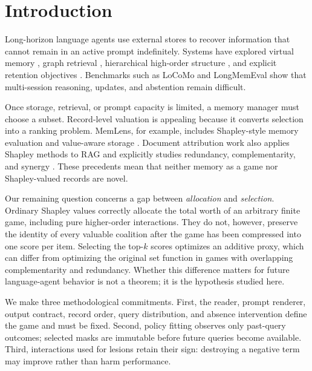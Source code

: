 \section{Introduction}
\label{sec:introduction}

Long-horizon language agents use external stores to recover information that cannot
remain in an active prompt indefinitely. Systems have explored virtual memory
\citep{packer2023memgpt}, graph retrieval \citep{gutierrez2024hipporag},
hierarchical high-order structure \citep{yue2026hypermem}, and explicit retention
objectives \citep{kang2026oslmr}. Benchmarks such as LoCoMo
\citep{maharana2024locomo} and LongMemEval \citep{wu2025longmemeval} show that
multi-session reasoning, updates, and abstention remain difficult.

Once storage, retrieval, or prompt capacity is limited, a memory manager must choose
a subset. Record-level valuation is appealing because it converts selection into a
ranking problem. MemLens, for example, includes Shapley-style memory evaluation and
value-aware storage \citep{wei2026memlens}. Document attribution work also applies
Shapley methods to RAG and explicitly studies redundancy, complementarity, and
synergy \citep{nematov2025source}. These precedents mean that neither memory as a
game nor Shapley-valued records are novel.

Our remaining question concerns a gap between \emph{allocation} and
\emph{selection}. Ordinary Shapley values correctly allocate the total worth of an
arbitrary finite game, including pure higher-order interactions. They do not,
however, preserve the identity of every valuable coalition after the game has been
compressed into one score per item. Selecting the top-\(k\) scores optimizes an
additive proxy, which can differ from optimizing the original set function in games
with overlapping complementarity and redundancy. Whether this difference matters
for future language-agent behavior is not a theorem; it is the hypothesis studied
here.

We make three methodological commitments. First, the reader, prompt renderer, output
contract, record order, query distribution, and absence intervention define the game
and must be fixed. Second, policy fitting observes only past-query outcomes; selected
masks are immutable before future queries become available. Third, interactions used
for lesions retain their sign: destroying a negative term may improve rather than
harm performance.

